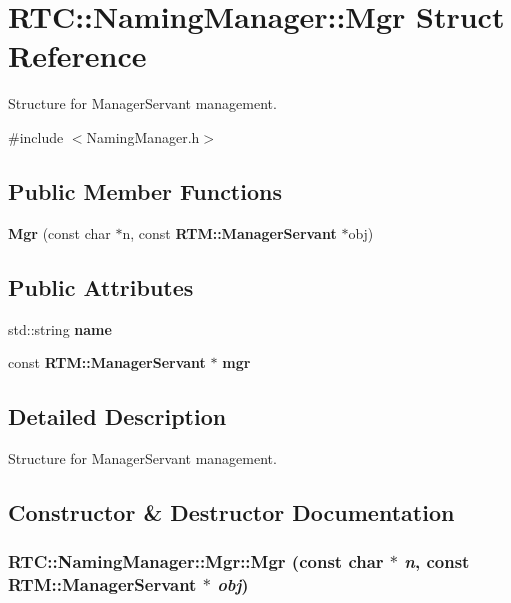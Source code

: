 \section{RTC::NamingManager::Mgr Struct Reference}
\label{structRTC_1_1NamingManager_1_1Mgr}


Structure for ManagerServant management.  




{\ttfamily \#include $<$NamingManager.h$>$}

\subsection*{Public Member Functions}
\begin{DoxyCompactItemize}
\item 
{\bf Mgr} (const char $\ast$n, const {\bf RTM::ManagerServant} $\ast$obj)
\end{DoxyCompactItemize}
\subsection*{Public Attributes}
\begin{DoxyCompactItemize}
\item 
std::string {\bf name}
\item 
const {\bf RTM::ManagerServant} $\ast$ {\bf mgr}
\end{DoxyCompactItemize}


\subsection{Detailed Description}
Structure for ManagerServant management. 

\subsection{Constructor \& Destructor Documentation}
\subsubsection[{Mgr}]{\setlength{\rightskip}{0pt plus 5cm}RTC::NamingManager::Mgr::Mgr (const char $\ast$ {\em n}, \/  const {\bf RTM::ManagerServant} $\ast$ {\em obj})\hspace{0.3cm}{\ttfamily  [inline]}}\label{structRTC_1_1NamingManager_1_1Mgr_ade49dca7d1070f525e0d6b6db8967a60}



